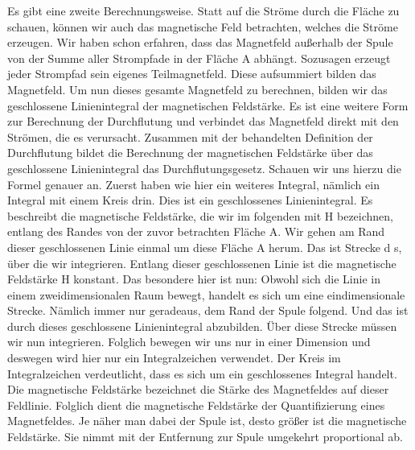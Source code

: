 \begin{frame}
{	Es gibt eine zweite Berechnungsweise. Statt auf die Ströme durch die Fläche zu schauen, können wir auch das magnetische Feld betrachten, welches die Ströme erzeugen. 
	Wir haben schon erfahren, dass das Magnetfeld außerhalb der Spule von der Summe aller Strompfade in der Fläche A abhängt. Sozusagen erzeugt jeder Strompfad sein eigenes Teilmagnetfeld. Diese aufsummiert bilden das Magnetfeld. Um nun dieses gesamte Magnetfeld zu berechnen, bilden wir das geschlossene Linienintegral der magnetischen Feldstärke. Es ist eine weitere Form zur Berechnung der Durchflutung und verbindet das Magnetfeld direkt mit den Strömen, die es verursacht. Zusammen mit der behandelten Definition der Durchflutung bildet die Berechnung der magnetischen Feldstärke über das geschlossene Linienintegral das Durchflutungsgesetz. 
	Schauen wir uns hierzu die Formel genauer an. Zuerst haben wie hier ein weiteres Integral, nämlich ein Integral mit einem Kreis drin. Dies ist ein geschlossenes Linienintegral. Es beschreibt die magnetische Feldstärke, die wir im folgenden mit H bezeichnen, entlang des Randes von der zuvor betrachten Fläche A. Wir gehen am Rand dieser geschlossenen Linie einmal um diese Fläche A herum. Das ist Strecke d s, über die wir integrieren. Entlang dieser geschlossenen Linie ist die magnetische Feldstärke H konstant. Das besondere hier ist nun: Obwohl sich die Linie in einem zweidimensionalen Raum bewegt, handelt es sich um eine eindimensionale Strecke. Nämlich immer nur geradeaus, dem Rand der Spule folgend. Und das ist durch dieses geschlossene Linienintegral abzubilden.
	Über diese Strecke müssen wir nun integrieren. Folglich bewegen wir uns nur in einer Dimension und deswegen wird hier nur ein Integralzeichen verwendet. Der Kreis im Integralzeichen verdeutlicht, dass es sich um ein geschlossenes Integral handelt.
	Die magnetische Feldstärke bezeichnet die Stärke des Magnetfeldes auf dieser Feldlinie. Folglich dient die magnetische Feldstärke der Quantifizierung eines Magnetfeldes. 
	Je näher man dabei der Spule ist, desto größer ist die magnetische Feldstärke. Sie nimmt mit der Entfernung zur Spule umgekehrt proportional ab.}
\end{frame}

